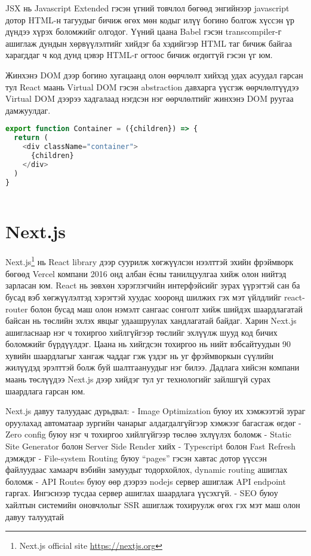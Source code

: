 JSX нь Javascript Extended гэсэн үгний товчлол бөгөөд энгийнээр javascript дотор HTML-н тагуудыг бичиж өгөх мөн кодыг илүү богино болгож хүссэн үр дүндээ хүрэх боломжийг олгодог. Үүний цаана Babel гэсэн transcompiler-г ашиглаж дундын хөрвүүлэлтийг хийдэг ба хэдийгээр HTML таг бичиж байгаа харагддаг ч код дунд цэвэр HTML-г огтоос бичиж өгдөггүй гэсэн үг юм.

Жинхэнэ DOM дээр богино хугацаанд олон өөрчлөлт хийхэд удах асуудал гарсан тул React маань Virtual DOM гэсэн abstraction давхарга үүсгэж өөрчлөлтүүдээ Virtual DOM дээрээ хадгалаад нэгдсэн нэг өөрчлөлтийг жинхэнэ DOM руугаа дамжуулдаг. 

\begin{lstlisting}[language=Javascript, caption=JSX ашиглаж "container" класстай html элемент буцаах компонент, frame=single]
export function Container = ({children}) => {
  return (
    <div className="container">
      {children}
    </div>
  )
}
    
\end{lstlisting}

\section{Next.js}
Next.js\footnote{Next.js official site \url{https://nextjs.org}} нь React library дээр суурилж хөгжүүлсэн нээлттэй эхийн фрэймворк бөгөөд Vercel компани 2016 онд албан ёсны танилцуулгаа хийж олон нийтэд зарласан юм. React нь зөвхөн хэрэглэгчийн интерфэйсийг зурах үүрэгтэй сан ба бусад вэб хөгжүүлэлтэд хэрэгтэй хуудас хооронд шилжих гэх мэт үйлдлийг react-router болон бусад маш олон нэмэлт сангаас сонголт хийж шийдэх шаардлагатай байсан нь төслийн эхлэх явцыг удаашруулах хандлагатай байдаг. Харин Next.js ашигласнаар нэг ч тохиргоо хийлгүйгээр төслийг эхлүүлж шууд код бичих боломжийг бүрдүүлдэг. Цаана нь хийгдсэн тохиргоо нь нийт вэбсайтуудын 90 хувийн шаардлагыг хангаж чаддаг гэж үздэг нь уг фрэймворкын сүүлийн жилүүдэд эрэлттэй болж буй шалтгаануудыг нэг билээ. Дадлага хийсэн компани маань төслүүдээ Next.js дээр хийдэг тул уг технологийг зайлшгүй сурах шаардлага гарсан юм. 

Next.js давуу талуудаас дурьдвал:
- Image Optimization буюу их хэмжээтэй зураг оруулахад автоматаар зургийн чанарыг алдагдалгүйгээр хэмжээг багасгаж өгдөг
- Zero config буюу нэг ч тохиргоо хийлгүйгээр төслөө эхлүүлэх боломж
- Static Site Generator болон Server Side Render хийх
- Typescript болон Fast Refresh дэмждэг
- File-system Routing буюу “pages” гэсэн хавтас дотор үүссэн файлуудаас хамаарч вэбийн замуудыг тодорхойлох, dynamic routing ашиглах боломж
- API Routes буюу өөр дээрээ nodejs сервер ашиглаж API endpoint гаргах. Ингэснээр тусдаа сервер ашиглах шаардлага үүсэхгүй.    
- SEO буюу хайлтын системийн оновчлолыг SSR ашиглаж тохируулж өгөх гэх мэт маш олон давуу талуудтай

